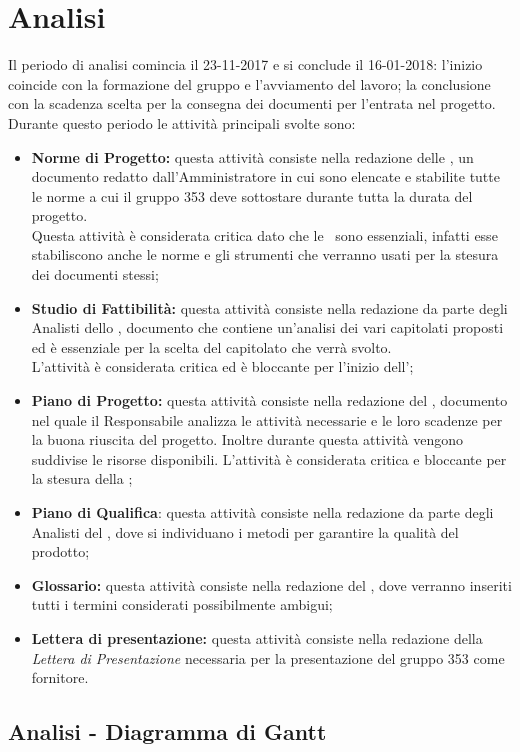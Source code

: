 \documentclass[PianoDiProgetto.tex]{subfiles}
\begin{document}
\section{Analisi}
Il periodo di analisi comincia il 23-11-2017 e si conclude il 16-01-2018: l'inizio coincide con la formazione del gruppo e l'avviamento del lavoro; la conclusione con la scadenza scelta per la consegna dei documenti per l'entrata nel progetto. Durante questo periodo le attività principali svolte sono:
\begin{itemize}
	\item \textbf{Norme di Progetto:} questa attività consiste nella redazione delle \ndp, un documento redatto dall'Amministratore in cui sono elencate e stabilite tutte le norme a cui il gruppo 353 deve sottostare durante tutta la durata del progetto.\\ 
	Questa attività è considerata critica dato che le \ndp\ sono essenziali, infatti esse stabiliscono anche le norme e gli strumenti che verranno usati per la stesura dei documenti stessi;
	\item \textbf{Studio di Fattibilità:} questa attività consiste nella redazione da parte degli Analisti dello \sdf, documento che contiene un'analisi dei vari capitolati proposti ed è essenziale per la scelta del capitolato che verrà svolto. \\
	L'attività è considerata critica ed è bloccante per l'inizio dell'\adr;
	\item \textbf{Piano di Progetto:} questa attività consiste nella redazione del \pdp, documento nel quale il Responsabile analizza le attività necessarie e le loro scadenze per la buona riuscita del progetto. Inoltre durante questa attività vengono suddivise le risorse disponibili. L'attività è considerata critica e bloccante per la stesura della ;
	\item \textbf{Piano di Qualifica}: questa attività consiste nella redazione da parte degli Analisti del \pdq, dove si individuano i metodi per garantire la qualità del prodotto;
	\item \textbf{Glossario:} questa attività consiste nella redazione del \g, dove verranno inseriti tutti i termini considerati possibilmente ambigui;
	\item \textbf{Lettera di presentazione:} questa attività consiste nella redazione della \textit{Lettera di Presentazione} necessaria per la presentazione del gruppo 353 come fornitore. 	
\end{itemize}	
\begin{landscape}
	\subsection{Analisi - Diagramma di Gantt}


			
\end{landscape}	
\end{document}
